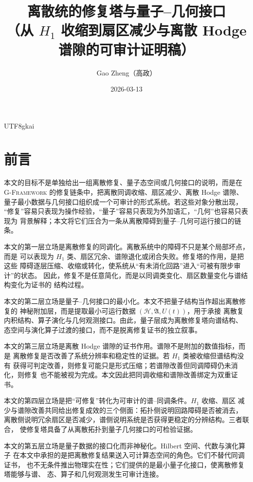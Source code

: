 \documentclass[12pt]{article}
\newcommand{\GFramework}{\textsc{G-Framework}}
\begin{document}
\begin{CJK*}{UTF8}{gkai}

\title{离散统的修复塔与量子--几何接口\\（从 $H_1$ 收缩到扇区减少与离散 Hodge 谱隙的可审计证明稿）}
\newcommand{\CertificateAuthorCN}{Gao Zheng（高政）}
\author{\CertificateAuthorCN}
\date{2026-03-13}
\maketitle

\section*{前言}

本文的目标不是单独给出一组离散修复、量子态空间或几何接口的说明，而是在
\GFramework{} 的修复链条中，把离散同调收缩、扇区减少、离散 Hodge 谱隙、
量子最小数据与几何接口组织成一个可审计的形式系统。若这些对象分散出现，
“修复”容易只表现为操作经验，“量子”容易只表现为外加语汇，“几何”也容易只表现为
背景解释；本文将它们压合为一条从离散障碍到量子--几何可运行接口的链条。

本文的第一层立场是离散修复的同调化。离散系统中的障碍不只是某个局部坏点，而是
可以表现为 \(H_1\) 类、扇区冗余、谱隙退化或闭合失败。修复塔的作用，是把这些
障碍逐层压缩、收缩或转化，使系统从“有未消化回路”进入“可被有限步审计”的状态。
因此，修复不是任意简化，而是以同调类变化、扇区数量变化与谱结构变化为证书的
结构过程。

本文的第二层立场是量子--几何接口的最小化。本文不把量子结构当作超出离散修复的
神秘附加层，而是提取最小可运行数据 \((\mathcal H,\mathfrak A,U(t))\)，用于承接
离散复内积结构、算子演化与几何观测接口。由此，量子层成为离散修复塔向谱结构、
态空间与演化算子过渡的接口，而不是脱离修复证书的独立叙事。

本文的第三层立场是离散 Hodge 谱隙的证书作用。谱隙不是附加的数值指标，而是
离散修复是否改善了系统分辨率和稳定性的证据。若 \(H_1\) 类被收缩但谱结构没有
获得可判定改善，则修复可能只是形式压缩；若谱隙改善但同调障碍仍未消化，则修复
也不能被视为完成。本文因此把同调收缩和谱隙改善绑定为双重证书。

本文的第四层立场是把“可修复”转化为可审计的谱--同调条件。\(H_1\) 收缩、扇区
减少与谱隙改善共同给出修复成效的三个侧面：拓扑侧说明回路障碍是否被消去，
离散侧说明冗余扇区是否减少，谱侧说明系统是否获得更稳定的分辨结构。三者联合，
使修复塔具备了从离散拓扑到量子几何接口的可检验证据。

本文的第五层立场是量子数据的接口化而非神秘化。Hilbert 空间、代数与演化算子
在本文中承担的是把离散修复结果送入可计算态空间的角色。它们不替代同调证书，
也不无条件推出物理实在性；它们提供的是最小量子化接口，使离散修复塔能够与谱、
态、算子和几何观测发生可审计连接。


\end{CJK*}
\end{document}
